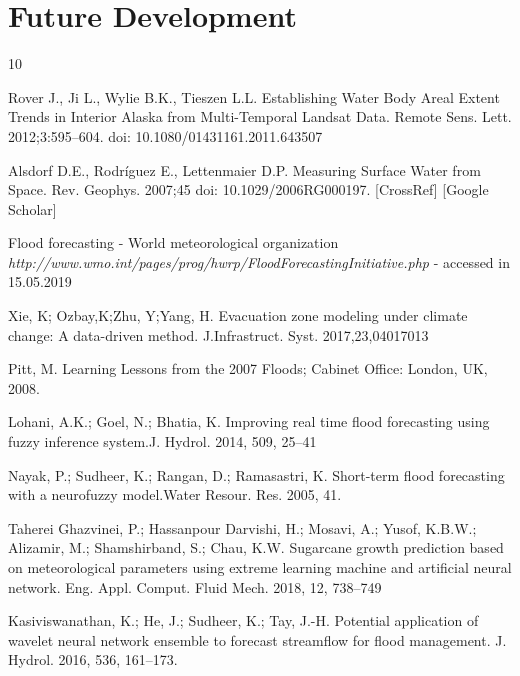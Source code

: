 \documentclass[12pt, a4paper]{report}
\begin{document}
\section{Future Development}


\renewcommand{\bibname}{Bibliography}


\begin{thebibliography} {10}

 Rover J., Ji L., Wylie B.K., Tieszen L.L. Establishing Water Body Areal Extent Trends in Interior Alaska from Multi-Temporal Landsat Data. Remote Sens. Lett. 2012;3:595–604. doi: 10.1080/01431161.2011.643507

 Alsdorf D.E., Rodríguez E., Lettenmaier D.P. Measuring Surface Water from Space. Rev. Geophys. 2007;45 doi: 10.1029/2006RG000197. [CrossRef] [Google Scholar]

Flood forecasting - World meteorological organization \textit{http://www.wmo.int/pages/prog/hwrp/FloodForecastingInitiative.php} - accessed in 15.05.2019


 Xie, K; Ozbay,K;Zhu, Y;Yang, H. Evacuation zone modeling under climate change: A data-driven method. J.Infrastruct. Syst. 2017,23,04017013

Pitt, M.	Learning Lessons from the 2007 Floods; Cabinet Office: London, UK, 2008.

Lohani, A.K.; Goel, N.; Bhatia, K. Improving real time flood forecasting using fuzzy inference system.J. Hydrol. 2014, 509, 25–41

Nayak, P.; Sudheer, K.; Rangan, D.; Ramasastri, K. Short-term flood forecasting with a neurofuzzy model.Water Resour. Res. 2005, 41.

Taherei Ghazvinei, P.; Hassanpour Darvishi, H.; Mosavi, A.; Yusof, K.B.W.; Alizamir, M.; Shamshirband, S.; Chau, K.W. Sugarcane growth prediction based on meteorological parameters using extreme learning machine and artificial neural network. Eng. Appl. Comput. Fluid Mech. 2018, 12, 738–749

Kasiviswanathan, K.; He, J.; Sudheer, K.; Tay, J.-H. Potential application of wavelet neural network ensemble to forecast streamflow for flood management. J. Hydrol. 2016, 536, 161–173.


\end{thebibliography}
\end{document}
